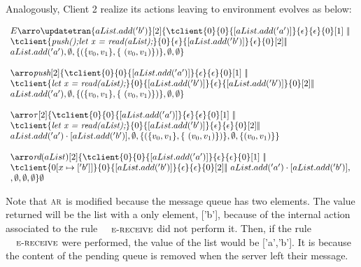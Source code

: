 \documentclass[envcountsect,runningheads,orivec]{llncs}
\begin{document}
Analogously, Client 2 realize its actions leaving to environment evolves as below:

\[
\begin{array}{l}
E \arrobyclient{\updatetran{aList.add('b')}}{2} \environment{\tclient{0}{0}{[aList.add('a')]}{\epsilon}{\epsilon}{0}[1]\ \bigpar\
\\
\tclient{\textit{push();let x = read(aList);}}{0}{\epsilon}{[aList.add('b')]}{\epsilon}{0}[2]  \bigpar\ 
\\ aList.add('a')} {\emptyset}{\{( \{ v_0,v_1 \} , \{\ (v_0,v_1) \} ) \}}{\emptyset}{\emptyset} 
\\
\\
\arrobyclient{\pushtran}{2} \environment{\tclient{0}{0}{[aList.add('a')]}{\epsilon}{\epsilon}{0}[1]\ \bigpar\
\\
\tclient{\textit{let x = read(aList);}}{0}{[aList.add('b')]}{\epsilon}{[aList.add('b')]}{0}[2]  \bigpar\ 
\\ aList.add('a')}{\emptyset}{\{( \{ v_0,v_1 \} , \{\ (v_0,v_1) \} ) \}}{\emptyset}{\emptyset} 
\\
\\
\arrobyclient{\tau}{2} \environment{\tclient{0}{0}{[aList.add('a')]}{\epsilon}{\epsilon}{0}[1]\ \bigpar\
\\
\tclient{\textit{let x = read(aList);}}{0}{[aList.add('b')]}{\epsilon}{\epsilon}{0}[2]  \bigpar\ 
\\aList.add('a') \cdot [aList.add('b')]} {\emptyset}{\{( \{ v_0,v_1 \} , \{\ (v_0,v_1) \} ) \}}{\emptyset}{\{ (v_0,v_1) \}} 
\\
\\
\arrobyclient{\readtran{aList}}{2} \environment{\tclient{0}{0}{[aList.add('a')]}{\epsilon}{\epsilon}{0}[1]\ \bigpar\
\\
\tclient{\update{0}{x}{['b']}}{0}{[aList.add('b')]}{\epsilon}{\epsilon}{0}[2]  \bigpar\ aList.add('a') \cdot [aList.add('b')]} 
\\
{\emptyset}{\emptyset}{\emptyset}{\emptyset} 
\end{array}
\]
		
Note that $\textsc{\scriptsize{AR}}$ is modified because the message queue has two elements. The value returned will be the list with a only element, ['b'], because of the internal action associated to the rule $\textsc{\small{e-receive}}$ did not perform it. Then, if the rule $\textsc{\small{e-receive}}$ were performed, the value of the list would be ['a','b']. It is because the content of the pending queue is removed when the server left their message. 
\end{document}

